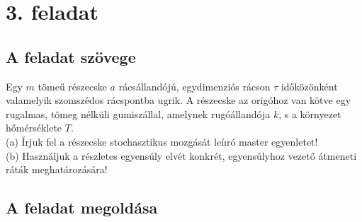 \documentclass[12pt]{article}
\begin{document}
\newpage
\section*{3. feladat}
\subsection*{A feladat szövege}
Egy $m$ tömeű részecske $a$ rácsállandójú, egydimenziós rácson $\tau$ időközönként valamelyik
szomszédos rácspontba ugrik. A részecske az origóhoz van kötve egy rugalmas, tömeg nélküli gumiszállal, amelynek rugóállandója $k$, s a környezet hőmérséklete $T$.\\
(a) Írjuk fel a részecske stochasztikus mozgását leíıró master egyenletet!\\
(b) Használjuk a részletes egyensúly elvét konkrét, egyensúlyhoz vezető átmeneti ráták meghatározására!

\subsection*{A feladat megoldása}
\end{document}

